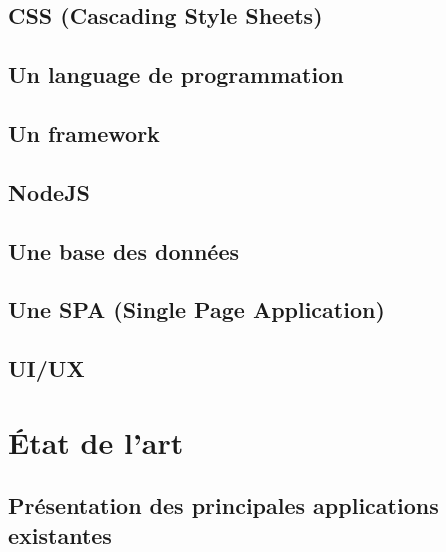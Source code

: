 \documentclass[12pt, a4paper]{report}
\begin{document}
    \section{CSS (Cascading Style Sheets)}\label{sec:css}
    

    \section{Un language de programmation}\label{sec:language-de-programmation}
    

    \section{Un framework}\label{sec:framework}
    

    \section{NodeJS}\label{sec:nodejs}
    

    \section{Une base des données}\label{sec:base-de-donnees}
    

    \section{Une SPA (Single Page Application)}\label{sec:spa}
    
    
    \section{UI/UX}\label{sec:ui-ux}
    
    

    \chapter{État de l'art}\label{cha:etat-de-l-art}
    

    \section{Présentation des principales applications existantes}\label{sec:definitions-et-concepts-cles}
    
\end{document}
